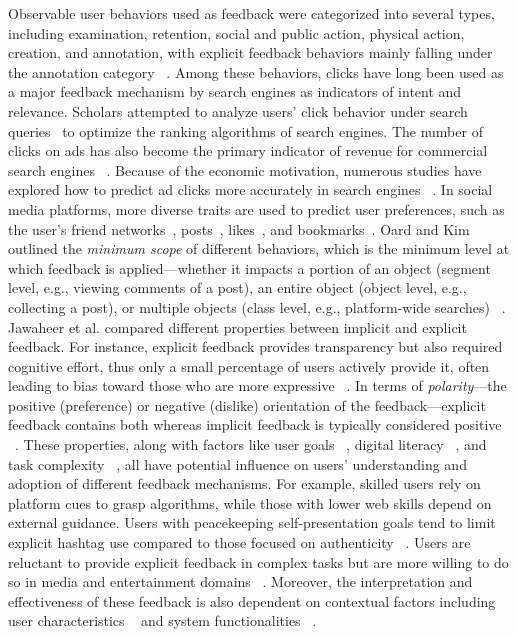 Observable user behaviors used as feedback were categorized into several types, including examination, retention, social and public action, physical action, creation, and annotation, with explicit feedback behaviors mainly falling under the annotation category ~\cite{jannach2018recommending}. Among these behaviors, clicks have long been used as a major feedback mechanism by search engines as indicators of intent and relevance. Scholars attempted to analyze users' click behavior under search queries~\cite{zhang2011user,shen2012personalized} to optimize the ranking algorithms of search engines. The number of clicks on ads has also become the primary indicator of revenue for commercial search engines ~\cite{kim2011advertiser}. Because of the economic motivation, numerous studies have explored how to predict ad clicks more accurately in search engines ~\cite{jacques2015differentiation,liu2010personalized}. In social media platforms, more diverse traits are used to predict user preferences, such as the user's friend networks~\cite{ellison2020we}, posts~\cite{kim2016click}, likes~\cite{cheung2022influences, hu2022interest}, and bookmarks~\cite{klaisubun2007behavior}. Oard and Kim outlined the \textit{minimum scope} of different behaviors, which is the minimum level at which feedback is applied---whether it impacts a portion of an object (segment level, e.g., viewing comments of a post), an entire object (object level, e.g., collecting a post), or multiple objects (class level, e.g., platform-wide searches) ~\cite{oard2001modeling}. Jawaheer et al. compared different properties between implicit and explicit feedback. For instance, explicit feedback provides transparency but also required cognitive effort, thus only a small percentage of users actively provide it, often leading to bias toward those who are more expressive ~\cite{jawaheer2014modeling}. In terms of \textit{polarity}---the positive (preference) or negative (dislike) orientation of the feedback---explicit feedback contains both whereas implicit feedback is typically considered positive ~\cite{jawaheer2014modeling, hu2008collaborative}. These properties, along with factors like user goals ~\cite{nazari2022choice,liang2023enabling}, digital literacy ~\cite{devito2018people}, and task complexity ~\cite{white2005study}, all have potential influence on users' understanding and adoption of different feedback mechanisms. For example, skilled users rely on platform cues to grasp algorithms, while those with lower web skills depend on external guidance. Users with peacekeeping self-presentation goals tend to limit explicit hashtag use compared to those focused on authenticity ~\cite{devito2017algorithms}. Users are reluctant to provide explicit feedback in complex tasks but are more willing to do so in media and entertainment domains ~\cite{white2005study,jawaheer2014modeling}. Moreover, the interpretation and effectiveness of these feedback is also dependent on contextual factors including user characteristics ~\cite{jawaheer2014modeling} and system functionalities ~\cite{liu2024train}.

